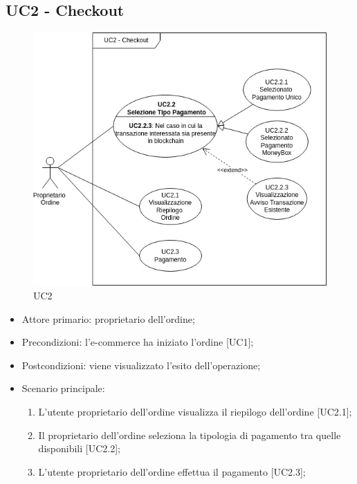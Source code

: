 \subsection{UC2 - Checkout}\label{subsection: UC2}

\begin{figure}[H]
    \centering
    \includegraphics[scale=0.8]{immagini/UC2.png}
    \caption{UC2}
\end{figure}

\begin{itemize}
    \item Attore primario: proprietario dell'ordine;
    \item Precondizioni: l'e-commerce\glo{} ha iniziato l'ordine [UC1];
    \item Postcondizioni: viene visualizzato l'esito dell'operazione;
    \item Scenario principale:
    \begin{enumerate}
        \item L'utente proprietario dell'ordine visualizza il riepilogo dell'ordine [UC2.1];
        \item Il proprietario dell'ordine seleziona la tipologia di pagamento tra quelle disponibili [UC2.2];
        \item L'utente proprietario dell'ordine effettua il pagamento [UC2.3];
    \end{enumerate}
\end{itemize}

